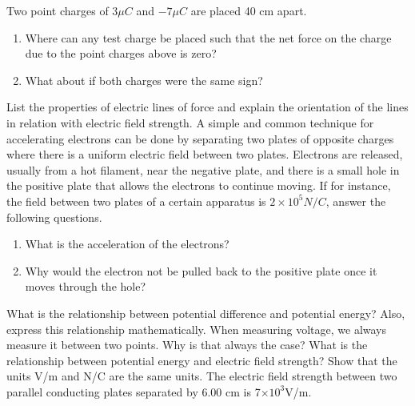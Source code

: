 \documentclass[12pt,addpoints]{exam}
\begin{document}
\begin{questions}
		\question Two point charges of $3\mu C$ and $-7 \mu C$ are placed 40 cm apart.
		\begin{enumerate}[label=(\roman*)]
			\item Where can any test charge be placed such that the net force on the charge due to the point charges above is zero?\vspace{1.5in}
			\item What about if both charges were the same sign?\vspace{1.5in}
		\end{enumerate}
		\question List the properties of electric lines of force and explain the orientation of the lines in relation with electric field strength.\vspace{2.5in}
		\question A simple and common technique for accelerating electrons can be done by separating two plates of opposite charges where there is a uniform electric field between two plates. Electrons are released, usually from a hot filament, near the negative plate, and there is a small hole in the positive plate that allows the electrons to continue moving. If for instance, the field between two plates of a certain apparatus is $2\times10^{5}N/C$, answer the following questions.\vspace{1in}
		\begin{enumerate}[label=(\roman*)]
			\item What is the acceleration of the electrons?\vspace{1.5in}
			\item Why would the electron not be pulled back to the positive plate once it moves through the hole?\vspace{1.5in}
		\end{enumerate}
		\question What is the relationship between potential difference and potential energy? Also, express this relationship mathematically.\vspace{1.5in}
		\question When measuring voltage, we always measure it between two points. Why is that always the case?\vspace{1.5in}
		\question What is the relationship between potential energy and electric field strength?\vspace{1.5in}
		\question Show that the units V/m and N/C are the same units.\vspace{1.5in}
		\question The electric field strength between two parallel conducting plates separated by 6.00 cm is 7$\times10^{3}$V/m.
		\begin{enumerate}[label=(\roman*)]

\end{enumerate}
\end{questions}
\end{document}
